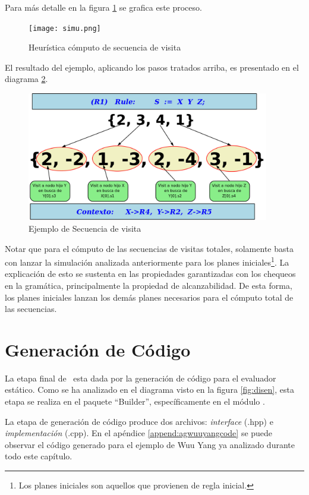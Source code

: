 Para más detalle en la figura \ref{fig:simul} se grafica este proceso.

\begin{figure}[!ht]\centering
\texttt{[image: simu.png]}
\caption{\label{fig:simul}Heurística cómputo de secuencia de visita}
\end{figure}

El resultado del ejemplo, aplicando los pasos tratados arriba, es presentado en el diagrama \ref{fig:resul_vis}.

\begin{figure}[!ht]\centering
\includegraphics[width=300pt,height=160pt]{plan2seq.png}
\caption{\label{fig:resul_vis} Ejemplo de Secuencia de visita}
\end{figure}

Notar que para el cómputo de las secuencias de visitas totales, solamente basta con lanzar la simulación analizada anteriormente para los planes iniciales\footnote{Los planes iniciales son aquellos que provienen de regla inicial.}. La explicación de esto se sustenta en las propiedades garantizadas con los chequeos en la gramática, principalmente la propiedad de alcanzabilidad. De esta forma, los planes iniciales lanzan los demás planes necesarios para el cómputo total de las secuencias.

\section{Generación de Código}
\label{sec:gencodigo}

La etapa final de \maggen\ esta dada por la generación de código para el evaluador estático. Como se ha analizado en el diagrama visto en la figura \ref{fig:disen}, esta etapa se realiza en el paquete ``Builder'', específicamente en el módulo .

La etapa de generación de código produce dos archivos: \textit{interface} (.hpp) e \textit{implementación} (.cpp). En el apéndice \ref{append:agwuuyangcode} se puede observar el código generado para el ejemplo de Wuu Yang ya analizado durante todo este capítulo.

